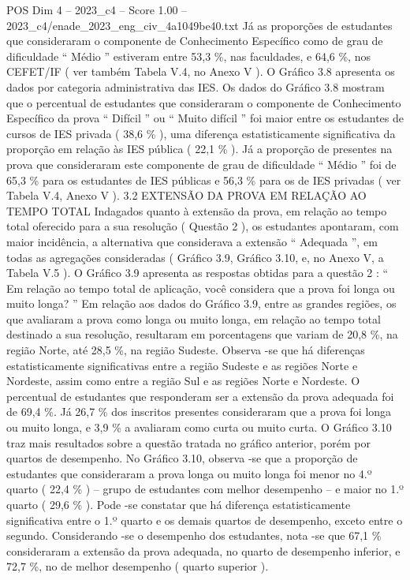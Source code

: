 \begin{textsample}{POS Dim 4 – 2023\_c4 – Score 1.00 – 2023\_c4/enade\_2023\_eng\_civ\_4a1049be40.txt}
Já as proporções de estudantes que consideraram o componente de Conhecimento Específico como de grau de dificuldade “ Médio ” estiveram entre 53,3 \%, nas faculdades, e 64,6 \%, nos CEFET/IF ( ver também Tabela V.4, no Anexo V ).
O Gráfico 3.8 apresenta os dados por categoria administrativa das IES.
Os dados do Gráfico 3.8 mostram que o percentual de estudantes que consideraram o componente de Conhecimento Específico da prova “ Difícil ” ou “ Muito difícil ” foi maior entre os estudantes de cursos de IES privada ( 38,6 \% ), uma diferença estatisticamente significativa da proporção em relação às IES pública ( 22,1 \% ).
Já a proporção de presentes na prova que consideraram este componente de grau de dificuldade “ Médio ” foi de 65,3 \% para os estudantes de IES públicas e 56,3 \% para os de IES privadas ( ver Tabela V.4, Anexo V ). 3.2 EXTENSÃO DA PROVA EM RELAÇÃO AO TEMPO TOTAL Indagados quanto à extensão da prova, em relação ao tempo total oferecido para a sua resolução ( Questão 2 ), os estudantes apontaram, com maior incidência, a alternativa que considerava a extensão “ Adequada ”, em todas as agregações consideradas ( Gráfico 3.9, Gráfico 3.10, e, no Anexo V, a Tabela V.5 ).
O Gráfico 3.9 apresenta as respostas obtidas para a questão 2 : “ Em relação ao tempo total de aplicação, você considera que a prova foi longa ou muito longa? ” Em relação aos dados do Gráfico 3.9, entre as grandes regiões, os que avaliaram a prova como longa ou muito longa, em relação ao tempo total destinado a sua resolução, resultaram em porcentagens que variam de 20,8 \%, na região Norte, até 28,5 \%, na região Sudeste.
Observa -se que há diferenças estatisticamente significativas entre a região Sudeste e as regiões Norte e Nordeste, assim como entre a região Sul e as regiões Norte e Nordeste.
O percentual de estudantes que responderam ser a extensão da prova adequada foi de 69,4 \%.
Já 26,7 \% dos inscritos presentes consideraram que a prova foi longa ou muito longa, e 3,9 \% a avaliaram como curta ou muito curta.
O Gráfico 3.10 traz mais resultados sobre a questão tratada no gráfico anterior, porém por quartos de desempenho.
No Gráfico 3.10, observa -se que a proporção de estudantes que consideraram a prova longa ou muito longa foi menor no 4.º quarto ( 22,4 \% ) – grupo de estudantes com melhor desempenho – e maior no 1.º quarto ( 29,6 \% ).
Pode -se constatar que há diferença estatisticamente significativa entre o 1.º quarto e os demais quartos de desempenho, exceto entre o segundo.
Considerando -se o desempenho dos estudantes, nota -se que 67,1 \% consideraram a extensão da prova adequada, no quarto de desempenho inferior, e 72,7 \%, no de melhor desempenho ( quarto superior ).

\end{textsample}
